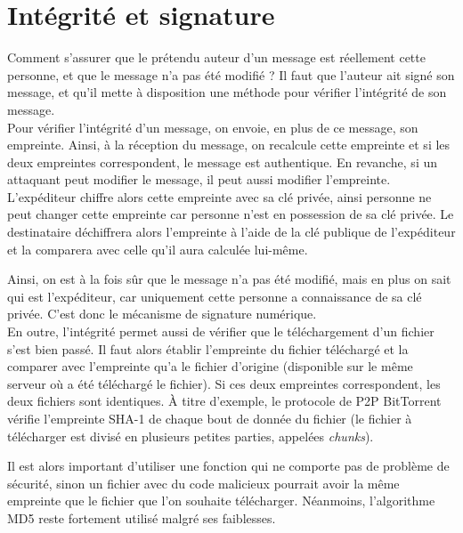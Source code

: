 
\section{Intégrité et signature}
Comment s'assurer que le prétendu auteur d'un message est
réellement cette personne, et que le message n'a pas été modifié ?
Il faut que l'auteur ait signé son message, et qu'il mette à
disposition une méthode pour vérifier l'intégrité de son message.
\\

Pour vérifier l'intégrité d'un message, on envoie, en plus de ce
message, son empreinte. Ainsi, à la réception du
message, on recalcule cette empreinte et si les deux empreintes
correspondent, le message est
authentique. En revanche, si un attaquant peut modifier le message,
il peut aussi modifier l'empreinte. L'expéditeur chiffre
alors cette empreinte avec sa clé privée, ainsi personne ne peut
changer cette empreinte car personne n'est en possession de sa clé
privée. Le destinataire déchiffrera alors l'empreinte à l'aide de
la clé publique de l'expéditeur et la comparera avec celle qu'il
aura calculée lui-même.

Ainsi, on est à la fois sûr que le message n'a pas été modifié,
mais en plus on sait qui est l'expéditeur, car uniquement cette
personne a connaissance de sa clé privée. C'est donc le mécanisme
de signature numérique.
\\

En outre, l'intégrité permet aussi de vérifier que le
téléchargement d'un fichier s'est bien passé. Il faut alors
établir 
l'empreinte du fichier téléchargé et la comparer avec l'empreinte
qu'a le fichier d'origine (disponible sur le même serveur où a été 
téléchargé le fichier). Si ces deux empreintes correspondent, les
deux fichiers sont identiques. À titre d'exemple, le protocole
de P2P BitTorrent vérifie l'empreinte SHA-1 de chaque bout de donnée
du fichier 
(le fichier à télécharger est divisé en plusieurs petites parties, 
appelées \emph{chunks}).  

Il est alors important d'utiliser une fonction qui ne comporte pas
de problème de sécurité, sinon un fichier avec du code malicieux
pourrait avoir la même empreinte que le fichier que l'on souhaite
télécharger. Néanmoins, l'algorithme MD5 reste fortement utilisé
malgré ses faiblesses.

